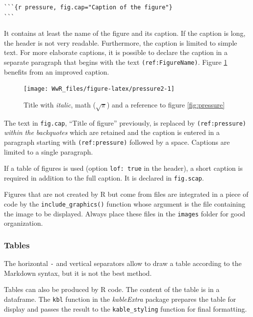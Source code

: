 \documentclass[
  12pt,
  american,
  a4paper,
  extrafontsizes,onecolumn,openright
  ]{memoir}
\begin{document}
\begin{verbatim}
```{r pressure, fig.cap="Caption of the figure"}
```
\end{verbatim}

It contains at least the name of the figure and its caption.
If the caption is long, the header is not very readable.
Furthermore, the caption is limited to simple text.
For more elaborate captions, it is possible to declare the caption in a separate paragraph that begins with the text \texttt{(ref:FigureName)}.
Figure \ref{fig:pressure2} benefits from an improved caption.



\scriptsize

\begin{figure}

{\centering \texttt{[image: WwR\_files/figure-latex/pressure2-1]} 

}

\caption{Title with \emph{italic}, math (\(\sqrt\pi\)) and a reference to figure \ref{fig:pressure}}\label{fig:pressure2}
\end{figure}

\normalsize

The text in \texttt{fig.cap}, \enquote{Title of figure} previously, is replaced by \texttt{(ref:pressure)} \emph{within the backquotes} which are retained and the caption is entered in a paragraph starting with \texttt{(ref:pressure)} followed by a space.
Captions are limited to a single paragraph.

If a table of figures is used (option \texttt{lof:\ true} in the header), a short caption is required in addition to the full caption.
It is declared in \texttt{fig.scap}.

Figures that are not created by R but come from files are integrated in a piece of code by the \texttt{include\_graphics()} function whose argument is the file containing the image to be displayed.
Always place these files in the \texttt{images} folder for good organization.

\subsubsection{Tables}\label{tables}

The horizontal \texttt{-} and vertical \texttt{\textbar{}} separators allow to draw a table according to the Markdown syntax, but it is not the best method.

Tables can also be produced by R code.
The content of the table is in a dataframe.
The \texttt{kbl} function in the \emph{kableExtra} package prepares the table for display and passes the result to the \texttt{kable\_styling} function for final formatting.
\end{document}
